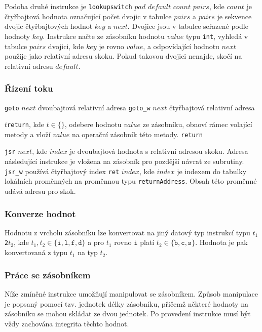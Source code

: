 Podoba druhé instrukce je \texttt{lookupswitch} $pad$ $default$ $count$ $pairs$, kde $count$ je čtyřbajtová hodnota označující počet dvojic v tabulce $pairs$ a $pairs$ je sekvence dvojic čtyřbajtových hodnot $key$ a $next$. Dvojice jsou v tabulce seřazené podle hodnoty $key$. Instrukce načte ze zásobníku hodnotu $value$ typu \texttt{int}, vyhledá v tabulce $pairs$ dvojici, kde $key$ je rovno $value$, a odpovídající hodnotu $next$ použije jako relativní adresu skoku. Pokud takovou dvojici nenajde, skočí na relativní adresu $default$.

\subsubsection {Řízení toku}

\texttt{goto} $next$ dvoubajtová relativní adresa
\texttt{goto\_w} $next$ čtyřbajtová relativní adresa

$t$\texttt{return}, kde $t \in \{   \}$, odebere hodnotu $value$ ze zásobníku, obnoví rámec volající metody a vloží $value$ na operační zásobník této metody.
\texttt{return} 

\texttt{jsr} $next$, kde $index$ je dvoubajtová hodnota s relativní adresou skoku. Adresa následující instrukce je vložena na zásobník pro pozdější návrat ze subrutiny.
\texttt{jsr\_w} používá čtyřbajtový index
\texttt{ret} $index$, kde $index$ je indexem do tabulky lokálních proměnných na proměnnou typu \texttt{returnAddress}. Obsah této proměnné udává adresu pro skok.

\subsubsection{Konverze hodnot}

Hodnotu z vrcholu zásobníku lze konvertovat na jiný datový typ instrukcí typu $t_1$\texttt{2}$t_2$, kde $t_1, t_2 \in \{\texttt{i}, \texttt{l},\texttt{f},\texttt{d}\}$ a pro $t_1$ rovno $\texttt{i}$ platí $t_2 \in \{\texttt{b}, \texttt{c},\texttt{s}\}$. Hodnota je pak konvertovaná z typu $t_1$ na typ $t_2$.

\subsubsection{Práce se zásobníkem}

Níže zmíněné instrukce umožňují manipulovat se zásobníkem. Způsob manipulace je popsaný pomocí tzv. jednotek délky zásobníku, přičemž některé hodnoty na zásobníku se mohou skládat ze dvou jednotek. Po provedení instrukce musí být vždy zachována integrita těchto hodnot. %

